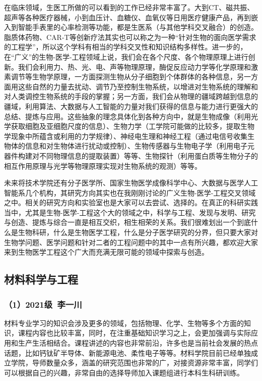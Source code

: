 \documentclass[11pt,oneside]{book}
\begin{document}
在临床领域，生医工所做的可以看到的工作已经非常丰富了。大到CT、磁共振、超声等各种医疗器械，小到血压计、血糖仪、血氧仪等日用医疗健康产品，再到嵌入到智能手表里的心率检测等功能，都是生医系（与其他学科交叉融合）的创造。脂质体药物、CAR-T等创新疗法其实也可以称之为一种“针对生物的面向医学需求的工程学”，所以这个学科有相当的学科交叉性和知识结构多样性。进一步的，在“广义”的生物-医学-工程领域上说，我们会在各个尺度、各个物理原理上进行创新。我们会利用力、热、光、电、声等物理原理，酶促反应动力学等化学原理和激素调节等生物学原理，一方面探测生物从分子细胞到个体群体的各种信息，另一方面用这些自然的力量去扰动、调节乃至控制生物系统，以增进对生物系统的理解和对人类调控生物系统的手段的掌握；另一方面，我们会从物理的疆域跨越到信息的疆域，利用算法、大数据与人工智能的力量对我们获得的信息与能力进行更强大的总结、提炼与应用。这些抽象的理念具体化到各种方向中，就是生物成像（利用光学获取细胞及亚细胞尺度的信息）、生物力学（工学院可能做的比较多，提取生物学现象中所蕴含或利用的力学规律）、神经电生理和神经工程（通过电信号收集生物体的信息和对生物体进行扰动或控制）、生物传感器与生物电子学（利用电子元器件构建对不同物理信息的提取装置）等等、生物探针（利用蛋白质等生物分子的相互作用原理与光学等物理原理实现对生物系统的观测）等等。

未来将技术学院还有分子医学所、国家生物医学成像科学中心、大数据与医学人工智能系几个机构，其研究方向其实也在我刚刚讨论的广义生物-医学-工程交叉领域之中。相关的研究方向和实验室也是大家可以去尝试、选择的。在真正的科研实践当中，尤其是生物-医学-工程这个大的领域之中，科学与工程、发现与发明、研究与创造、提炼与综合一直是相互交织，相生相荣的关系。我们很难划出一个到底什么是生物科研，什么是生物医学工程，什么是分子医学研究的分界，但只要大家对生物学问题、医学问题和针对二者的工程问题中的其中一点有所兴趣，都欢迎大家来到生物医学工程这个广大而充满无限可能的领域中探索与创造。

        
\subsection{材料科学与工程}
\subsubsection{（1）2021级\ 李一川}
材料专业学习的知识会涉及更多的领域，包括物理、化学、生物等多个方面的知识，课程内容也比较丰富，同时，在注重基础知识学习之上，会更加强调与实际应用和生产生活相结合。课程讲述的内容也非常前沿，许多也是当前社会发展的热点话题，比如钙钛矿半导体、新能源电池、柔性电子等等。材料学院目前已经单独成立学院，导师数量众多，涵盖的研究范围也非常的广，对接资源非常丰富，同学们可以根据自己的兴趣，非常自由的选择导师加入课题组进行本科生科研训练。
\end{document}
